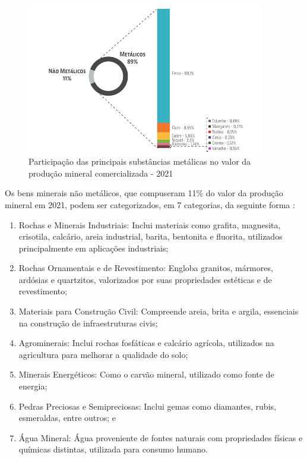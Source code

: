 \begin{figure}[!htb]
    \centering
    \includegraphics[width=0.93\textwidth]{figures/image12_participacao_minerais.png}
    \caption{Participação das principais substâncias metálicas no valor da produção mineral comercializada - 2021}
    \label{fig:participacao_minerais}
\end{figure}

Os bens minerais não metálicos, que compuseram 11\% do valor da produção mineral em 2021, podem ser categorizados, em 7 categorias, da seguinte forma \cite{carvalho2018sustentabilidade}:

\begin{enumerate}
    \item Rochas e Minerais Industriais: Inclui materiais como grafita, magnesita, crisotila, calcário, areia industrial, barita, bentonita e fluorita, utilizados principalmente em aplicações industriais;
    
    \item Rochas Ornamentais e de Revestimento: Engloba granitos, mármores, ardósias e quartzitos, valorizados por suas propriedades estéticas e de revestimento;
    
    \item Materiais para Construção Civil: Compreende areia, brita e argila, essenciais na construção de infraestruturas civis;
    
    \item Agrominerais: Inclui rochas fosfáticas e calcário agrícola, utilizados na agricultura para melhorar a qualidade do solo;
    
    \item Minerais Energéticos: Como o carvão mineral, utilizado como fonte de energia;
    
    \item Pedras Preciosas e Semipreciosas: Inclui gemas como diamantes, rubis, esmeraldas, entre outros; e
    
    \item Água Mineral: Água proveniente de fontes naturais com propriedades físicas e químicas distintas, utilizada para consumo humano.
\end{enumerate}

